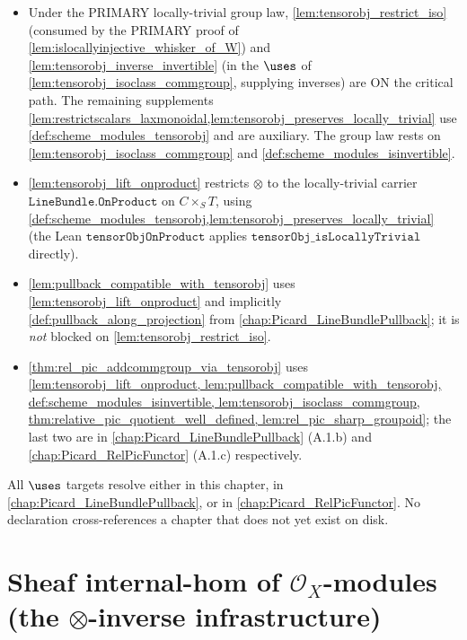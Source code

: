 \begin{itemize}
    on top of the assembled locally-trivial associator/unitors/braiding; the
    \(\mathrm{Units}(\mathrm{Skeleton}(\Scheme.\mathtt{Modules}\,X))\) presentation
    via \texttt{jw\_ismonoidal} is retained as the route~(e) fallback.
  \item Under the PRIMARY locally-trivial group law, \cref{lem:tensorobj_restrict_iso}
    (consumed by the PRIMARY proof of \cref{lem:islocallyinjective_whisker_of_W}) and
    \cref{lem:tensorobj_inverse_invertible} (in the \(\uses\) of
    \cref{lem:tensorobj_isoclass_commgroup}, supplying inverses) are ON the critical
    path. The remaining supplements
    \cref{lem:restrictscalars_laxmonoidal,lem:tensorobj_preserves_locally_trivial}
    use \cref{def:scheme_modules_tensorobj} and are auxiliary. The group law rests on
    \cref{lem:tensorobj_isoclass_commgroup} and \cref{def:scheme_modules_isinvertible}.
  \item \cref{lem:tensorobj_lift_onproduct} restricts \(\otimes\) to the
    locally-trivial carrier \(\texttt{LineBundle.OnProduct}\) on \(C \times_S T\),
    using \cref{def:scheme_modules_tensorobj,lem:tensorobj_preserves_locally_trivial}
    (the Lean \(\mathtt{tensorObjOnProduct}\) applies
    \(\mathtt{tensorObj\_isLocallyTrivial}\) directly).
  \item \cref{lem:pullback_compatible_with_tensorobj} uses
    \cref{lem:tensorobj_lift_onproduct} and implicitly
    \cref{def:pullback_along_projection} from
    \cref{chap:Picard_LineBundlePullback}; it is \emph{not} blocked on
    \cref{lem:tensorobj_restrict_iso}.
  \item \cref{thm:rel_pic_addcommgroup_via_tensorobj} uses
    \cref{lem:tensorobj_lift_onproduct,
          lem:pullback_compatible_with_tensorobj,
          def:scheme_modules_isinvertible,
          lem:tensorobj_isoclass_commgroup,
          thm:relative_pic_quotient_well_defined,
          lem:rel_pic_sharp_groupoid}; the last two are in
    \cref{chap:Picard_LineBundlePullback} (A.1.b) and
    \cref{chap:Picard_RelPicFunctor} (A.1.c) respectively.
\end{itemize}
All \(\uses\) targets resolve either in this chapter, in
\cref{chap:Picard_LineBundlePullback}, or in
\cref{chap:Picard_RelPicFunctor}. No declaration cross-references a
chapter that does not yet exist on disk.

\section{Sheaf internal-hom of \(\mathcal{O}_X\)-modules (the \(\otimes\)-inverse
  infrastructure)}
\label{sec:tensorobj_dual_infra}

